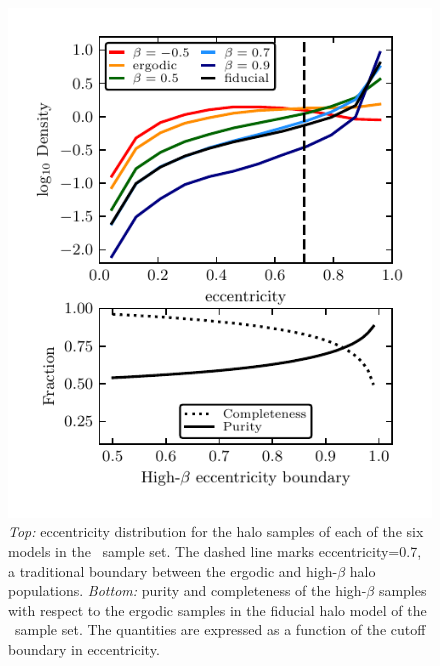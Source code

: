 \begin{figure}
    \centering
    \includegraphics[width=\columnwidth]{figure/ch2/APOGEEHaloEccentricityDistribution.pdf}
    \caption{\textit{Top:} eccentricity distribution for the halo samples of each of the six models in the \survey\ sample set. The dashed line marks eccentricity=0.7, a traditional boundary between the ergodic and high-$\beta$ halo populations. \textit{Bottom:} purity and completeness of the high-$\beta$ samples with respect to the ergodic samples in the fiducial halo model of the \survey\ sample set. The quantities are expressed as a function of the cutoff boundary in eccentricity.}
    \label{fig:EccentricityDistributions}
\end{figure}

